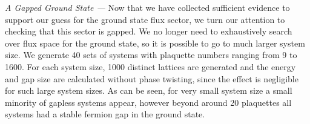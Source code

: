 \emph{A Gapped Ground State ---} Now that we have collected sufficient
evidence to support our guess for the ground state flux sector, we turn
our attention to checking that this sector is gapped. We no longer need
to exhaustively search over flux space for the ground state, so it is
possible to go to much larger system size. We generate 40 sets of
systems with plaquette numbers ranging from 9 to 1600. For each system
size, 1000 distinct lattices are generated and the energy and gap size
are calculated without phase twisting, since the effect is negligible
for such large system sizes. As can be seen, for very small system size
a small minority of gapless systems appear, however beyond around 20
plaquettes all systems had a stable fermion gap in the ground state.
